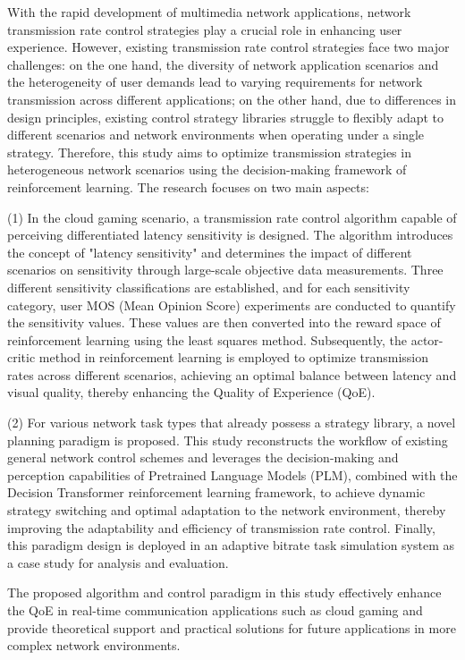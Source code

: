 \begin{abstract*}
  With the rapid development of multimedia network applications, network transmission rate control strategies play a crucial role in enhancing user experience. However, existing transmission rate control strategies face two major challenges: on the one hand, the diversity of network application scenarios and the heterogeneity of user demands lead to varying requirements for network transmission across different applications; on the other hand, due to differences in design principles, existing control strategy libraries struggle to flexibly adapt to different scenarios and network environments when operating under a single strategy. Therefore, this study aims to optimize transmission strategies in heterogeneous network scenarios using the decision-making framework of reinforcement learning. The research focuses on two main aspects:

(1) In the cloud gaming scenario, a transmission rate control algorithm capable of perceiving differentiated latency sensitivity is designed. The algorithm introduces the concept of "latency sensitivity" and determines the impact of different scenarios on sensitivity through large-scale objective data measurements. Three different sensitivity classifications are established, and for each sensitivity category, user MOS (Mean Opinion Score) experiments are conducted to quantify the sensitivity values. These values are then converted into the reward space of reinforcement learning using the least squares method. Subsequently, the actor-critic method in reinforcement learning is employed to optimize transmission rates across different scenarios, achieving an optimal balance between latency and visual quality, thereby enhancing the Quality of Experience (QoE).

(2) For various network task types that already possess a strategy library, a novel planning paradigm is proposed. This study reconstructs the workflow of existing general network control schemes and leverages the decision-making and perception capabilities of Pretrained Language Models (PLM), combined with the Decision Transformer reinforcement learning framework, to achieve dynamic strategy switching and optimal adaptation to the network environment, thereby improving the adaptability and efficiency of transmission rate control. Finally, this paradigm design is deployed in an adaptive bitrate task simulation system as a case study for analysis and evaluation.

The proposed algorithm and control paradigm in this study effectively enhance the QoE in real-time communication applications such as cloud gaming and provide theoretical support and practical solutions for future applications in more complex network environments.

\end{abstract*}
